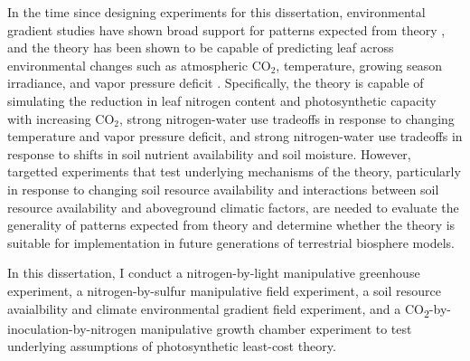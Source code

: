 In the time since designing experiments for this dissertation, environmental gradient studies have shown broad support for patterns expected from theory , and the theory has been shown to be capable of predicting leaf across environmental changes such as atmospheric CO$_2$, temperature, growing season irradiance, and vapor pressure deficit . Specifically, the theory is capable of simulating the reduction in leaf nitrogen content and photosynthetic capacity with increasing CO$_2$, strong nitrogen-water use tradeoffs in response to changing temperature and vapor pressure deficit, and strong nitrogen-water use tradeoffs in response to shifts in soil nutrient availability and soil moisture. However, targetted experiments that test underlying mechanisms of the theory, particularly in response to changing soil resource availability and interactions between soil resource availability and aboveground climatic factors, are needed to evaluate the generality of patterns expected from theory and determine whether the theory is suitable for implementation in future generations of terrestrial biosphere models.

In this dissertation, I conduct a nitrogen-by-light manipulative greenhouse experiment, a nitrogen-by-sulfur manipulative field experiment, a soil resource avaialbility and climate environmental gradient field experiment, and a CO\textsubscript{2}-by-inoculation-by-nitrogen manipulative growth chamber experiment to test underlying assumptions of photosynthetic least-cost theory.